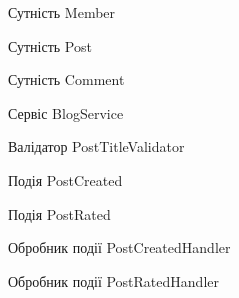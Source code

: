
\vspace{\baselineskip}

Сутність Member


Сутність Post


Сутність Comment


Сервіс BlogService


Валідатор PostTitleValidator


Подія PostCreated


Подія PostRated


Обробник події PostCreatedHandler


Обробник події PostRatedHandler


\clearpage
